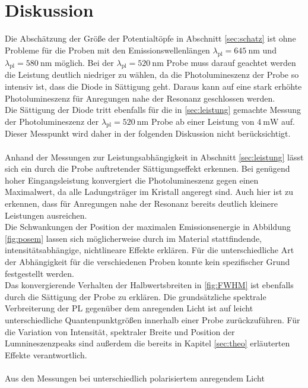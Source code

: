 \section{Diskussion}
Die Abschätzung der Größe der Potentialtöpfe in Abschnitt \ref{sec:schatz} ist ohne Probleme
für die Proben mit den Emissionswellenlängen $\lambda_{\text{pl}} = \SI{645}{\nano\meter}$
und $\lambda_{\text{pl}} = \SI{580}{\nano\meter}$ möglich. Bei der $\lambda_{\text{pl}} = \SI{520}{\nano\meter}$
Probe muss darauf geachtet werden die Leistung deutlich niedriger zu wählen, da die Photolumineszenz der Probe
so intensiv ist, dass die Diode in Sättigung geht. Daraus kann auf eine stark erhöhte Photolumineszenz für
Anregungen nahe der Resonanz geschlossen werden.\\
Die Sättigung der Diode tritt ebenfalls für die in \ref{sec:leistung}
gemachte Messung der Photolumineszenz der $\lambda_{\text{pl}} = \SI{520}{\nano\meter}$ Probe ab
einer Leistung von $\SI{4}{\milli\watt}$ auf. Dieser Messpunkt wird daher in der folgenden Diskussion nicht berücksichtigt.\\
\\
Anhand der Messungen zur Leistungsabhängigkeit in Abschnitt \ref{sec:leistung} lässt sich ein
durch die Probe auftretender Sättigungseffekt erkennen. Bei genügend hoher Eingangsleistung
konvergiert die Photolumineszenz gegen einen Maximalwert, da alle Ladungsträger im Kristall
angeregt sind. Auch hier ist zu erkennen, dass für Anregungen nahe der Resonanz bereits
deutlich kleinere Leistungen ausreichen.\\
Die Schwankungen der Position der maximalen Emissionsenergie in Abbildung \ref{fig:posem}
lassen sich möglicherweise durch im Material stattfindende, intensitätsabhängige, nichtlineare
Effekte erklären. Für die unterschiedliche Art der Abhängigkeit für die verschiedenen Proben konnte
kein spezifischer Grund festgestellt werden.\\
Das konvergierende Verhalten der Halbwertsbreiten in \ref{fig:FWHM} ist ebenfalls durch
die Sättigung der Probe zu erklären. Die grundsätzliche spektrale Verbreiterung der PL
gegenüber dem anregenden Licht ist auf leicht unterschiedliche Quantenpunktgrößen
innerhalb einer Probe zurückzuführen. Für die Variation von Intensität,
spektraler Breite und Position der Lumnineszenzpeaks sind außerdem die
bereits in Kapitel \ref{sec:theo} erläuterten Effekte verantwortlich. \\
\\
Aus den Messungen bei unterschiedlich polarisiertem anregendem Licht
